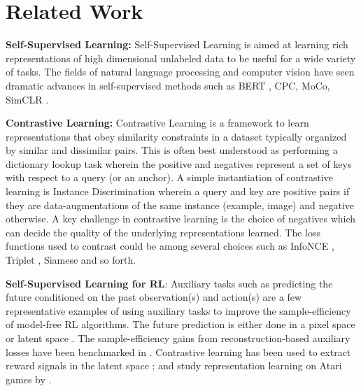 \section{Related Work}

{\textbf{Self-Supervised Learning:}} Self-Supervised Learning is aimed at learning rich representations of high dimensional unlabeled data to be useful for a wide variety of tasks. The fields of natural language processing and computer vision have seen dramatic advances in self-supervised methods such as BERT \cite{devlin2018bert}, CPC, MoCo, SimCLR \cite{henaff2019data, he2019momentum,chen2020simclr}.

{\textbf{Contrastive Learning:}} Contrastive Learning is a framework to learn representations that obey similarity constraints in a dataset typically organized by similar and dissimilar pairs. This is often best understood as performing a dictionary lookup task wherein the positive and negatives represent a set of keys with respect to a query (or an anchor). A simple instantiation of contrastive learning is Instance Discrimination \cite{wu2018unsupervised} wherein a query and key are positive pairs if they are data-augmentations of the same instance (example, image) and negative otherwise. A key challenge in contrastive learning is the choice of negatives which can decide the quality of the underlying representations learned. The loss functions used to contrast could be among several choices such as InfoNCE \cite{oord2018representation}, Triplet \cite{wang2015unsupervised}, Siamese \cite{chopra2005learning} and so forth.

{\textbf{Self-Supervised Learning for RL}}: Auxiliary tasks such as predicting the future conditioned on the past observation(s) and action(s) \cite{jaderberg2016reinforcement, shelhamer2016loss, oord2018representation, schmidhuber1990a} are a few representative examples of using auxiliary tasks to improve the sample-efficiency of model-free RL algorithms. The future prediction is either done in a pixel space \cite{jaderberg2016reinforcement} or latent space \cite{oord2018representation}. The sample-efficiency gains from reconstruction-based auxiliary losses have been benchmarked in \citet{jaderberg2016reinforcement, higgins2017darla, yarats2019improving}. Contrastive learning has been used to extract reward signals in the latent space \cite{sermanet2018time, dwibedi2018learning, warde2018unsupervised}; and study representation learning on Atari games by \citet{anand2019unsupervised}.

